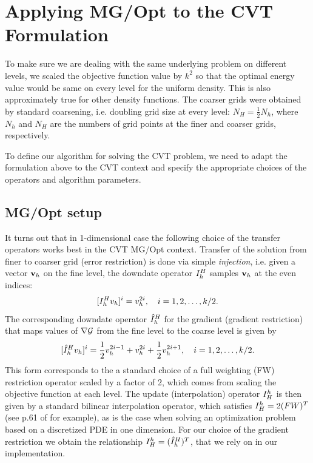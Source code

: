 \documentclass{siamltex}
\begin{document}
\section{Applying MG/Opt to the CVT Formulation}

To make sure we are dealing with the same underlying problem on different levels, we scaled the objective function value by $k^{2}$ so that the optimal energy value would be same on every level for the uniform density. This  is also approximately true for other density functions.  The coarser grids were obtained by standard coarsening, i.e. doubling grid size at every level:  $N_H= \frac{1}{2}N_h$, where $N_h$ and $N_H$ are the numbers of grid points at the finer and coarser grids, respectively.

To define our algorithm for solving the CVT problem, we need to adapt the formulation above to the CVT context and specify the appropriate choices of the operators and algorithm parameters.

\subsection{MG/Opt setup}

It turns out that in 1-dimensional case the following choice of the transfer operators works best in the CVT MG/Opt context. Transfer of the solution from finer to coarser grid (error restriction)  is done via simple {\em injection}, i.e. given a vector ${\bf v}_h$ on the fine level, the downdate operator $I_h^H$ samples ${\bf v}_h$ at the even indices:
$$
[I_h^H v_h]^{i}=v_h^{2i},\quad i=1,2,\ldots,k/2.
$$
The corresponding downdate operator ${\hat I}_h^H$ for the gradient (gradient restriction) that maps values of $\nabla \cg$ from the fine level to the coarse level is given by
$$
[{\hat I}_h^H v_h]^{i}=\frac{1}{2} v_h^{2i-1}+ v_h^{2i}+\frac{1}{2} v_h^{2i+1}, \quad i=1,2,\ldots,k/2.
$$
This form corresponds to the a standard choice of a full weighting (FW) restriction operator scaled by a factor of 2, which comes from scaling the objective function at each level. The update (interpolation) operator $I_H^h$ is then given by a standard bilinear interpolation operator, which satisfies $I_H^h =2(FW)^T$ (see p.61 of \cite{trotten} for example), as is the case when solving an optimization problem based on a discretized PDE in one dimension. For our choice of the gradient restriction we obtain the relationship $I_H^h=({\hat I}_h^H) ^T$, that we rely on in our implementation.

\end{document}
